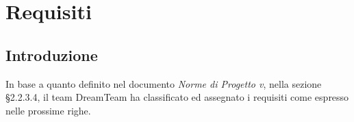 \section{Requisiti}

\subsection{Introduzione}
In base a quanto definito nel documento \textit{Norme di Progetto v}, nella sezione §2.2.3.4, il team DreamTeam ha classificato ed assegnato i requisiti come espresso nelle prossime righe.

